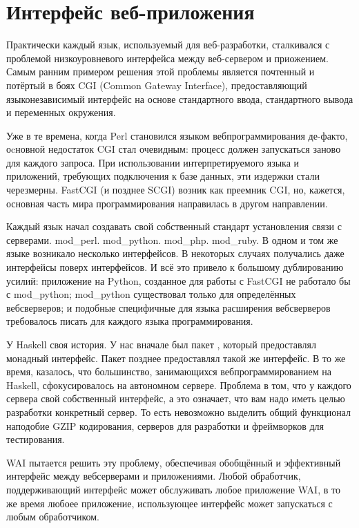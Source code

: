 \chapter {Интерфейс веб-приложения}\label{chap:web_application_interface}

Практически каждый язык, используемый для веб-разработки, сталкивался с проблемой
низкоуровневого интерфейса между веб-сервером и приожением. Самым ранним примером
решения этой проблемы является почтенный и потёртый в боях CGI (Common Gateway Interface), 
предоставляющий языконезависимый интерфейс на основе стандартного ввода, стандартного
вывода и переменных окружения.

Уже в те времена, когда Perl становился языком вебпрограммирования де-факто, оcновной
недостаток CGI стал очевидным: процесс должен запускаться заново для каждого запроса.
При использовании интерпретируемого языка и приложений, требующих подключения к базе
данных, эти издержки стали черезмерны. FastCGI (и позднее SCGI) возник как преемник
CGI, но, кажется, основная часть мира программирования направилась в другом направлении.

Каждый язык начал создавать свой собственный стандарт установления связи с серверами.
mod\_perl. mod\_python. mod\_php. mod\_ruby. В одном и том же языке возникало несколько
интерфейсов. В некоторых случаях получались даже интерфейсы поверх интерфейсов.
И всё это привело к большому дублированию усилий: приложение на Python, созданное
для работы с FastCGI не работало бы с mod\_python; mod\_python существовал только для
определённых вебсверверов; и подобные специфичные для языка расширения вебсверверов
требовалось писать для каждого языка программирования.

У Haskell своя история. У нас вначале был пакет ,
который предоставлял монадный интерфейс. Пакет 
позднее предоставлял такой же интерфейс. В то же время, казалось, что большинство,
занимающихся вебпрограммированием на Haskell, сфокусировалось на автономном сервере.
Проблема в том, что у каждого сервера свой собственный интерфейс, а это означает, что 
вам надо иметь целью разработки конкретный сервер. То есть невозможно выделить
общий функционал наподобие GZIP кодирования, серверов для разработки и фреймворков для тестирования.

WAI пытается решить эту проблему, обеспечивая обобщённый и эффективный интерфейс между
вебсерверами и приложениями. Любой обработчик, поддерживающий интерфейс может обслуживать
любое приложение WAI, в то же время любоее приложение, использующее интерфейс может
запускаться с любым обработчиком.

